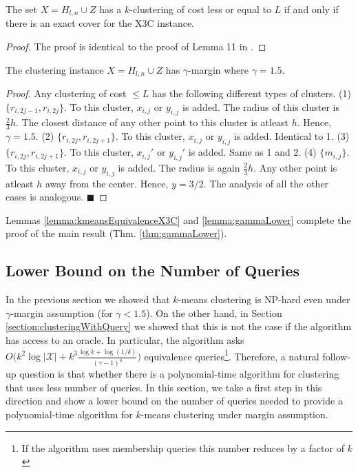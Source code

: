 \documentclass[orivec]{llncs}
\newcommand{\mc}{\mathcal}
\renewcommand{\qed}{\hfill\ensuremath{\blacksquare}}
\begin{document}
\begin{lemma}
\label{lemma:kmeansEquivalenceX3C}
The set $X = H_{l,n} \cup Z$ has a $k$-clustering of cost less or equal to $L$ if and only if there is an exact cover for the X3C instance.
\end{lemma}
\begin{proof}
The proof is identical to the proof of Lemma 11 in \cite{vattani2009hardness}.
\end{proof}

\begin{lemma}
\label{lemma:gammaLower}
The clustering instance $X = H_{l,n} \cup Z$ has $\gamma$-margin where $\gamma = 1.5$.
\end{lemma}
\begin{proof}
Any clustering of cost $\le L$ has the following different types of clusters. (1) $\{r_{i,2j-1}, r_{i, 2j}\}$. To this cluster, $x_{i,j}$ or $y_{i,j}$ is added. The radius of this cluster is $\frac{2}{3}h$. The closest distance of any other point to this cluster is atleast $h$. Hence, $\gamma = 1.5$. (2) $\{r_{i,2j}, r_{i, 2j+1}\}$. To this cluster, $x_{i,j}$ or $y_{i,j}$ is added. Identical to 1. 
(3) $\{r_{i,2j}, r_{i, 2j+1}\}$. To this cluster, $x_{i,j}'$ or $y_{i,j}'$ is added. Same as 1 and 2. (4) $\{m_{i,j}\}$. To this cluster, $x_{i,j}$ or $y_{i,j}$ is added. The radius is again $\frac{2}{3}h$. Any other point is atleast $h$ away from the center. Hence, $y= 3/2$. The analysis of all the other cases is analogous.
\qed
\end{proof}
Lemmas \ref{lemma:kmeansEquivalenceX3C} and \ref{lemma:gammaLower} complete the proof of the main result (Thm. \ref{thm:gammaLower}). 

\subsection{Lower Bound on the Number of Queries}

In the previous section we showed that $k$-means clustering is NP-hard even under $\gamma$-margin assumption (for $\gamma < 1.5$). On the other hand, in Section \ref{section:clusteringWithQuery} we showed that this is not the case if the algorithm has access to an oracle. In particular, the algorithm asks $O\big(k^2\log |\mc X| + k^3\frac{\log k + \log (1/\delta)}{(\gamma - 1)^4}\big)$ equivalence queries\footnote{If the algorithm uses membership queries this number reduces by a factor of $k$}. Therefore, a natural follow-up question is that whether there is a polynomial-time algorithm for clustering that uses less number of queries. In this section, we take a first step in this direction and show a lower bound on the number of queries needed to provide a polynomial-time algorithm for $k$-means clustering under margin assumption.
\end{document}
